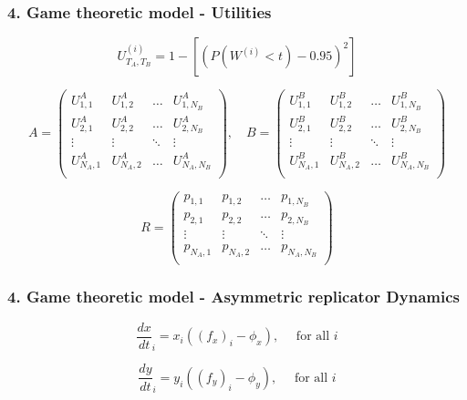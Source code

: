 \begin{frame}
    \frametitle{4. Game theoretic model - Utilities}

    \begin{equation*}
        U_{T_A,T_B}^{(i)} = 1 - \left[ (P(W^{(i)} < t) - 0.95)^2 \right]
    \end{equation*}

    \scriptsize
    \begin{equation*}
        A =
        \begin{pmatrix}
            U_{1,1}^A & U_{1,2}^A & \dots & U_{1,N_B}^A \\
            U_{2,1}^A & U_{2,2}^A & \dots & U_{2,N_B}^A \\
            \vdots & \vdots & \ddots & \vdots \\
            U_{N_A,1}^A & U_{N_A,2}^A & \dots & U_{N_A,N_B}^A \\
        \end{pmatrix}, \quad
        B =
        \begin{pmatrix}
            U_{1,1}^B & U_{1,2}^B & \dots & U_{1,N_B}^B \\
            U_{2,1}^B & U_{2,2}^B & \dots & U_{2,N_B}^B \\
            \vdots & \vdots & \ddots & \vdots \\
            U_{N_A,1}^B & U_{N_A,2}^B & \dots & U_{N_A,N_B}^B \\
        \end{pmatrix}
    \end{equation*}

    \vspace{1cm}

    \begin{equation*}
        R =
        \begin{pmatrix}
            p_{1,1} & p_{1,2} & \dots & p_{1,N_B} \\
            p_{2,1} & p_{2,2} & \dots & p_{2,N_B} \\
            \vdots & \vdots & \ddots & \vdots \\
            p_{N_A,1} & p_{N_A,2} & \dots & p_{N_A,N_B} \\
        \end{pmatrix}
    \end{equation*}

\end{frame}



\begin{frame}
    \frametitle{4. Game theoretic model - Asymmetric replicator Dynamics}
    \centering
    \begin{equation*}
        \frac{dx}{dt}_i = x_i((f_x)_i - \phi_x), \quad \text{ for all }i
    \end{equation*}

    \begin{equation*}
        \frac{dy}{dt}_i = y_i((f_y)_i - \phi_y), \quad \text{ for all }i
    \end{equation*}
\end{frame}


